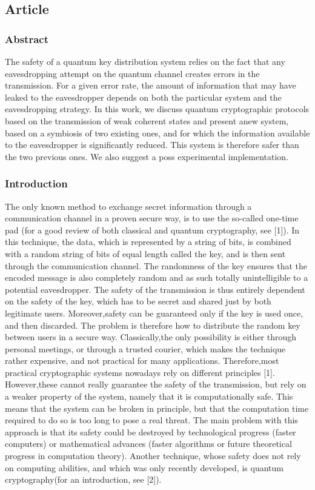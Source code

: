 \subsection{Article}

\subsubsection*{Abstract}
The safety of a quantum key distribution system relies on the fact that any eavesdropping attempt on the quantum channel creates errors in the transmission. For a given error rate, the amount of information that may have leaked to the eavesdropper depends on both the particular system and the eavesdropping strategy. In this work, we discuss quantum cryptographic protocols based on the transmission of weak coherent states and present anew system, based on a symbiosis of two existing ones, and for which the information available to the eavesdropper is significantly reduced. This system is therefore safer than the two previous ones. We also suggest a poss experimental implementation.

\subsubsection{Introduction}
The only known method to exchange secret information through a communication channel in a proven secure way, is to use the so-called one-time pad (for a good review of both classical and quantum cryptography, see [1]). In this technique, the data, which is represented by a string of bits, is combined with a random string of bits of equal length called the key, and is then sent through the communication channel. The randomness of the key ensures that the encoded message is also completely random and as such totally unintelligible to a potential eavesdropper. The safety of the transmission is thus entirely dependent on the safety of the key, which has to be secret and shared just by both legitimate users. Moreover,safety can be guaranteed only if the key is used once, and then discarded. The problem is therefore how to distribute the random key between users in a secure way. Classically,the only possibility is either through personal meetings, or through a trusted courier, which makes the technique rather expensive, and not practical for many applications. Therefore,most practical cryptographic systems nowadays rely on different principles [1]. However,these cannot really guarantee the safety of the transmission, but rely on a weaker property of the system, namely that it is computationally safe. This means that the system can be broken in principle, but that the computation time required to do so is too long to pose a real threat. The main problem with this approach is that its safety could be destroyed by technological progress (faster computers) or mathematical advances (faster algorithms or future theoretical progress in computation theory). Another technique, whose safety does not rely on computing abilities, and which was only recently developed, is quantum cryptography(for an introduction, see [2]).

